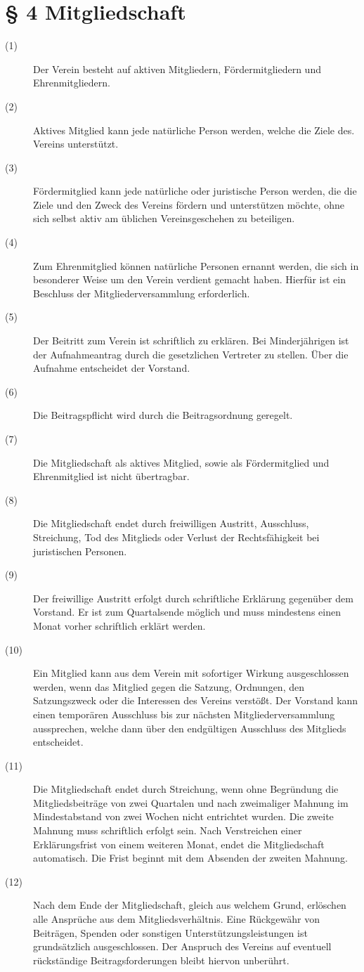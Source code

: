 \documentclass[a4paper,12pt]{scrartcl}
\begin{document}
\section*{\S{} 4 Mitgliedschaft}
\begin{description} 

\item[(1)] Der Verein besteht auf aktiven Mitgliedern, Fördermitgliedern und Ehrenmitgliedern.
\item[(2)] Aktives Mitglied kann jede natürliche Person werden, welche die Ziele des. Vereins unterstützt.
\item[(3)] Fördermitglied kann jede natürliche oder juristische Person werden, die die Ziele und den Zweck des Vereins fördern und unterstützen möchte, ohne sich selbst aktiv am üblichen Vereinsgeschehen zu beteiligen.
\item[(4)] Zum Ehrenmitglied können natürliche Personen ernannt werden, die sich in besonderer Weise um den Verein verdient gemacht haben. Hierfür ist ein Beschluss der Mitgliederversammlung erforderlich.
\item[(5)] Der Beitritt zum Verein ist schriftlich zu erklären. Bei Minderjährigen ist der Aufnahmeantrag durch die gesetzlichen Vertreter zu stellen. Über die Aufnahme entscheidet der Vorstand.
\item[(6)] Die Beitragspflicht wird durch die Beitragsordnung geregelt.
\item[(7)] Die Mitgliedschaft als aktives Mitglied, sowie als Fördermitglied und Ehrenmitglied ist nicht übertragbar. 
\item[(8)] Die Mitgliedschaft endet durch freiwilligen Austritt, Ausschluss, Streichung, Tod des Mitglieds oder Verlust der Rechtsfähigkeit bei juristischen Personen. 
\item[(9)] Der freiwillige Austritt erfolgt durch schriftliche Erklärung gegenüber dem Vorstand. Er ist zum Quartalsende möglich und muss mindestens einen Monat vorher schriftlich erklärt werden. 
\item[(10)] Ein Mitglied kann aus dem Verein mit sofortiger Wirkung ausgeschlossen werden, wenn das Mitglied gegen die Satzung, Ordnungen, den Satzungszweck oder die Interessen des Vereins verstößt. Der Vorstand kann einen temporären Ausschluss bis zur nächsten Mitgliederversammlung aussprechen, welche dann über den endgültigen Ausschluss des Mitglieds entscheidet. 
\item[(11)] Die Mitgliedschaft endet durch Streichung, wenn ohne Begründung die Mitgliedsbeiträge von zwei Quartalen und nach zweimaliger Mahnung im Mindestabstand von zwei Wochen nicht entrichtet wurden. Die zweite Mahnung muss schriftlich erfolgt sein. Nach Verstreichen einer Erklärungsfrist von einem weiteren Monat, endet die Mitgliedschaft automatisch. Die Frist beginnt mit dem Absenden der zweiten Mahnung. 
\item[(12)] Nach dem Ende der Mitgliedschaft, gleich aus welchem Grund, erlöschen alle Ansprüche aus dem Mitgliedsverhältnis. Eine Rückgewähr von Beiträgen, Spenden oder sonstigen Unterstützungsleistungen ist grundsätzlich ausgeschlossen. Der Anspruch des Vereins auf eventuell rückständige Beitragsforderungen bleibt hiervon unberührt.


\end{description}
\end{document}

